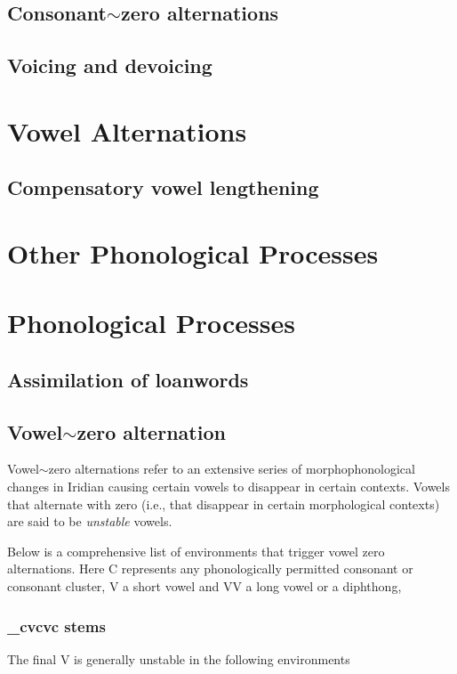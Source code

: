 \subsection{Consonant$\sim$zero alternations}

\subsection{Voicing and devoicing}

\section{Vowel Alternations}

\subsection{Compensatory vowel lengthening}

\section{Other Phonological Processes}


\section{Phonological Processes}

\subsection{Assimilation of loanwords}


\subsection{Vowel$\sim$zero alternation}

Vowel$\sim$zero alternations refer to an extensive series of morphophonological changes in Iridian causing certain vowels to disappear in certain contexts. Vowels that alternate with zero (i.e., that disappear in certain morphological contexts) are said to be \textit{unstable} vowels.

\par Below is a comprehensive list of environments that trigger vowel zero alternations. Here C represents any phonologically permitted consonant or consonant cluster, V a short vowel and VV a long vowel or a diphthong,

\subsubsection{\_cvcvc stems}
The final V is generally unstable in the following environments

